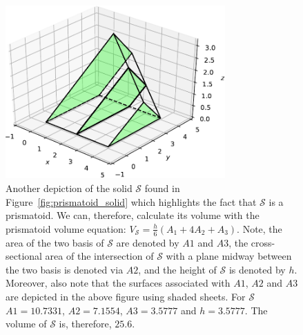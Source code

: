 \documentclass{article}
\theoremstyle{theorem}
\theoremstyle{definition}
\begin{document}
\begin{figure}[htb]
\centering
\includegraphics[width=0.75\textwidth]{prismatoid.pdf}
\caption{Another depiction of the solid $\mathcal{S}$ found in Figure~\ref{fig:prismatoid_solid} which highlights the fact that $\mathcal{S}$ is a prismatoid. We can, therefore, calculate its volume with the prismatoid volume equation: $V_{\mathcal{S}}= \frac{h}{6}(A_1+4A_2+A_3)$.
Note, the area of the two basis of $\mathcal{S}$ are denoted by $A1$ and $A3$, the cross-sectional area of the intersection of $\mathcal{S}$ with a plane midway between the two basis is denoted via $A2$, 
and the height of $\mathcal{S}$ is denoted by $h$. Moreover, also note that the surfaces associated with $A1$, $A2$ and $A3$ are depicted in the above figure using shaded sheets. For $\mathcal{S}$ 
$A1=10.7331$, $A2= 7.1554$, $A3 = 3.5777$ and $h = 3.5777$. The volume of $\mathcal{S}$ is, therefore, $25.6$.}
\label{fig:prismatoid}
\end{figure}
\end{document}
